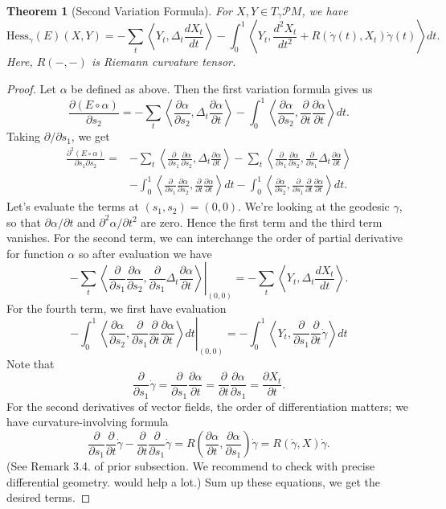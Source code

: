 \documentclass{article}
\newtheorem{theorem}{Theorem}[section]
\newcommand{\il}{\langle}
\newcommand{\ir}{\rangle}
\newcommand{\pp}{\partial}
\newcommand{\PM}{\mathcal{P}M}
\newcommand{\g}{\gamma}
\newcommand{\Hess}{\mathrm{Hess}}
\begin{document}
	\begin{theorem}[Second Variation Formula]\rm
	For $X,Y\in T_\g\PM$, we have
		$$\Hess_\g(E)(X,Y)=-\sum_t\left\il Y_t,\Delta_t\frac{dX_t}{dt}\right\ir
			-\int_0^1\left\il Y_t,\frac{d^2 X_t}{dt^2}+R(\dot{\g}(t),X_t)\dot{\g}(t)\right\ir dt.$$
	Here, $R(-,-)$ is Riemann curvature tensor.
	\end{theorem}
		\begin{proof}
		Let $\alpha$ be defined as above.
		Then the first variation formula gives us
			$$\frac{\pp (E\circ\alpha)}{\pp s_2}
				=-\sum_t\left\il \frac{\pp\alpha}{\pp s_2},\Delta_t\frac{\pp\alpha}{\pp t}\right\ir
				-\int_0^1\left\il\frac{\pp\alpha}{\pp s_2},\frac{\pp}{\pp t}\frac{\pp\alpha}{\pp t}\right\ir dt.$$
		Taking $\pp/\pp s_1$, we get
			$$\begin{aligned}
			\frac{\pp^2 (E\circ\alpha)}{\pp s_1\pp s_2}=
			&-\sum_t\left\il \frac{\pp}{\pp s_1}\frac{\pp\alpha}{\pp s_2},\Delta_t\frac{\pp\alpha}{\pp t}\right\ir
			-\sum_t\left\il \frac{\pp}{\pp s_1}\frac{\pp\alpha}{\pp s_2},\frac{\pp}{\pp s_1}\Delta_t\frac{\pp\alpha}{\pp t}\right\ir\\
			&-\int_0^1\left\il\frac{\pp}{\pp s_1}\frac{\pp\alpha}{\pp s_2},\frac{\pp}{\pp t}\frac{\pp\alpha}{\pp t}\right\ir dt
			-\int_0^1\left\il\frac{\pp\alpha}{\pp s_2},\frac{\pp}{\pp s_1}\frac{\pp}{\pp t}\frac{\pp\alpha}{\pp t}\right\ir dt.
			\end{aligned}$$
		Let's evaluate the terms at $(s_1,s_2)=(0,0)$.
		We're looking at the geodesic $\g$, so that $\pp\alpha/\pp t$ and $\pp^2\alpha/\pp t^2$ are zero.
		Hence the first term and the third term vanishes.
		For the second term, we can interchange the order of partial derivative for function $\alpha$ so after evaluation we have
			$$\left.-\sum_t\left\il \frac{\pp}{\pp s_1}\frac{\pp\alpha}{\pp s_2},\frac{\pp}{\pp s_1}\Delta_t\frac{\pp\alpha}{\pp t}\right\ir\right|_{(0,0)}
			=-\sum_t\left\il Y_t,\Delta_t\frac{dX_t}{d t}\right\ir.$$
		For the fourth term, we first have evaluation
			$$\left.-\int_0^1\left\il\frac{\pp\alpha}{\pp s_2},\frac{\pp}{\pp s_1}\frac{\pp}{\pp t}\frac{\pp\alpha}{\pp t}\right\ir dt\right|_{(0,0)}
			=-\int_0^1\left\il Y_t,\frac{\pp}{\pp s_1}\frac{\pp}{\pp t}\dot{\g}\right\ir dt
			$$
		Note that
			$$\frac{\pp}{\pp s_1}\dot{\g}=\frac{\pp}{\pp s_1}\frac{\pp\alpha}{\pp t}
			=\frac{\pp}{\pp t}\frac{\pp\alpha}{\pp s_1}=\frac{\pp X_t}{\pp t}.$$
		For the second derivatives of vector fields, the order of differentiation matters; we have curvature-involving formula
			$$\frac{\pp}{\pp s_1}\frac{\pp}{\pp t}\dot{\g}-\frac{\pp}{\pp t}\frac{\pp}{\pp s_1}\dot{\g}=R\left(\frac{\pp\alpha}{\pp t},\frac{\pp\alpha}{\pp s_1}\right)\dot{\g}=R(\dot{\g},X)\dot{\g}.$$
		(See Remark 3.4. of prior subsection.
		We recommend to check with precise differential geometry.
		\cite{sp} would help a lot.)
		Sum up these equations, we get the desired terms.
		\end{proof}
	
\end{document}
